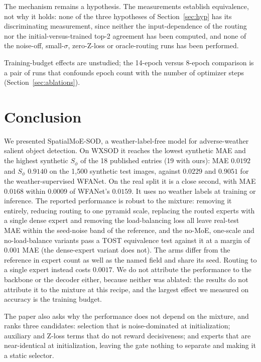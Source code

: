 \documentclass[10pt,a4paper,twocolumn,twoside]{article}
\begin{document}
The mechanism remains a hypothesis. The measurements establish equivalence, not why it holds:
none of the three hypotheses of Section~\ref{sec:hyp} has its discriminating measurement,
since neither the input-dependence of the routing nor the initial-versus-trained top-2
agreement has been computed, and none of the noise-off, small-$\sigma$, zero-Z-loss or
oracle-routing runs has been performed.

Training-budget effects are unstudied; the 14-epoch versus 8-epoch comparison is a pair of
runs that confounds epoch count with the number of optimizer steps (Section~\ref{sec:ablations}).

\section{Conclusion}

We presented SpatialMoE-SOD, a weather-label-free model for adverse-weather salient object
detection. On WXSOD it reaches the lowest synthetic MAE and the highest synthetic $S_\phi$ of
the 18 published entries (19 with ours): MAE $0.0192$ and $S_\phi$ $0.9140$ on the 1{,}500
synthetic test images, against $0.0229$ and $0.9051$ for the weather-supervised WFANet. On the
real split it is a close second, with MAE $0.0168$ within $0.0009$ of WFANet's $0.0159$. It
uses no weather labels at training or inference. The reported performance is robust to the mixture:
removing it entirely, reducing routing to one pyramid scale, replacing the routed experts with a
single dense expert and removing the load-balancing loss all leave real-test MAE within the
seed-noise band of the reference, and the no-MoE, one-scale and no-load-balance variants pass a
TOST equivalence test against it at a margin of $0.001$ MAE (the dense-expert variant does not).
The arms differ from the reference in expert count as well as the named field and share its
seed. Routing to a single expert instead costs $0.0017$. We do not
attribute the performance to the backbone or the decoder either, because neither was ablated:
the results do not attribute it to the mixture at this recipe, and the largest effect we
measured on accuracy is the training budget.

The paper also asks why the performance does not depend on the mixture, and ranks three candidates:
selection that is noise-dominated at initialization; auxiliary and Z-loss terms that do not
reward decisiveness; and experts that are
near-identical at initialization, leaving the gate nothing to separate and making it a static
selector.
\end{document}
